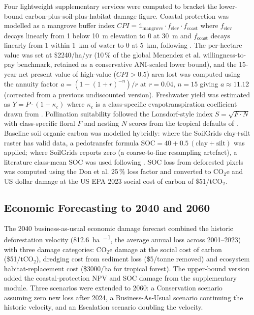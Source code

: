 \documentclass[12pt,a4paper]{article}
\begin{document}
Four lightweight supplementary services were computed to bracket
the lower-bound carbon-plus-soil-plus-habitat damage figure. Coastal
protection was modelled as a mangrove buffer index $CPI =
\mathbb{1}_{\text{mangrove}} \cdot f_{\text{elev}} \cdot f_{\text{coast}}$
where $f_{\text{elev}}$ decays linearly from 1 below \SI{10}{\metre}
elevation to 0 at \SI{30}{\metre} and $f_{\text{coast}}$ decays
linearly from 1 within \SI{1}{\kilo\metre} of water to 0 at
\SI{5}{\kilo\metre}, following \citet{menendez2020}. The per-hectare
value was set at \$2240/ha/yr (10\,\% of the global Menendez et al.
willingness-to-pay benchmark, retained as a conservative ANI-scaled
lower bound), and the 15-year net present value of high-value
($CPI > 0.5$) area lost was computed using the annuity factor
$a = (1 - (1+r)^{-n})/r$ at $r=0.04$, $n=15$ giving $a \approx 11.12$
(corrected from a previous undiscounted version). Freshwater yield
was estimated as $Y = P\cdot(1-\kappa_c)$ where $\kappa_c$ is a
class-specific evapotranspiration coefficient drawn from
\citet{zhang2001,sun2006}. Pollination suitability followed the
Lonsdorf-style index $S = \sqrt{F\cdot N}$ with class-specific
floral $F$ and nesting $N$ scores from the tropical defaults of
\citet{koh2016}. Baseline soil organic carbon was modelled hybridly:
where the SoilGrids clay+silt raster has valid data, a pedotransfer
formula $\text{SOC} = 40 + 0.5\,(\text{clay}+\text{silt})$ was
applied; where SoilGrids reports zero (a coarse-to-fine resampling
artefact), a literature class-mean SOC was used following
\citet{powers2018,donato2011}. SOC loss from deforested pixels was
computed using the Don et al. \citep{don2011} 25\,\% loss factor and
converted to CO$_2$e and US dollar damage at the US EPA 2023 social
cost of carbon of \$51/tCO$_2$.

\subsection{Economic Forecasting to 2040 and 2060}

The 2040 business-as-usual economic damage forecast combined the
historic deforestation velocity (\SI{812.6}{\hectare\per\year}, the
average annual loss across 2001--2023) with three damage categories:
CO$_2$e damage at the social cost of carbon (\$51/tCO$_2$), dredging
cost from sediment loss (\$5/tonne removed) and ecosystem
habitat-replacement cost (\$3000/ha for tropical forest). The
upper-bound version added the coastal-protection NPV and SOC damage
from the supplementary module. Three scenarios were extended to 2060:
a Conservation scenario assuming zero new loss after 2024, a
Business-As-Usual scenario continuing the historic velocity, and an
Escalation scenario doubling the velocity.
\end{document}
